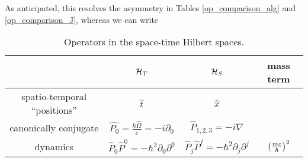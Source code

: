 As anticipated, this resolves the asymmetry in Tables \ref{op_comparison_alg} and \ref{op_comparison_J},
whereas we can write
{
  \begin{table}[h!]
    \centering
    \begin{tabular}{c||c|c|c}
                                                                                &
        $\mathcal{H}_T$                                                            &
        $\mathcal{H}_S$                                                            &
        {\footnotesize mass term}                                               \\
      \hline
      \hline
        {\footnotesize spatio-temporal ``positions''}                           &
        $\hat{t}$                                                               &
        $\hat{x}$                                                               &
                                                                                \\
      \hline
        {\footnotesize canonically conjugate}                                   & 
        $\hat{P_0} = \frac{\hbar\hat{\Omega}}{c} = -i\partial_{0}$              &
        $\hat{P}_{1,2,3} = -i\nabla$                                            &
                                                                                \\
      \hline
        {\footnotesize dynamics}                                                &
        $\hat{P}_{0}\hat{P}^{0} = -\hbar^2 \partial_{0}\partial^{0}$            &
        $\hat{P}_{j}\hat{P}^{j} = -\hbar^2 \partial_{j}\partial^{j}$            &
        $\qty(\frac{mc}{\hbar})^2$
    \end{tabular}
    \caption{
      Operators in the space-time Hilbert spaces.
    }
  \end{table}
}